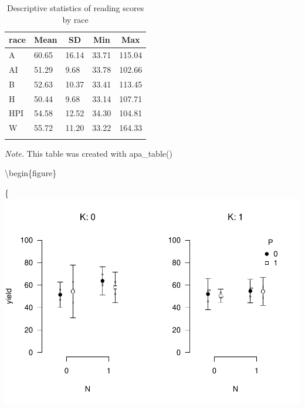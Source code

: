 \documentclass[
  english,
  man]{apa6}
\begin{document}
\begin{table}[tbp]

\begin{center}
\begin{threeparttable}

\caption{\label{tab:unnamed-chunk-2}Descriptive statistics of reading scores by race}

\begin{tabular}{lllll}
\toprule
race & \multicolumn{1}{c}{Mean} & \multicolumn{1}{c}{SD} & \multicolumn{1}{c}{Min} & \multicolumn{1}{c}{Max}\\
\midrule
A & 60.65 & 16.14 & 33.71 & 115.04\\
AI & 51.29 & 9.68 & 33.78 & 102.66\\
B & 52.63 & 10.37 & 33.41 & 113.45\\
H & 50.44 & 9.68 & 33.14 & 107.71\\
HPI & 54.58 & 12.52 & 34.30 & 104.81\\
W & 55.72 & 11.20 & 33.22 & 164.33\\
\bottomrule
\addlinespace
\end{tabular}

\begin{tablenotes}[para]
\normalsize{\textit{Note.} This table was created with apa\_table()}
\end{tablenotes}

\end{threeparttable}
\end{center}

\end{table}

\textbackslash begin\{figure\}

\{\centering \includegraphics{ms-template_files/figure-latex/beeplot-1}
\end{document}
